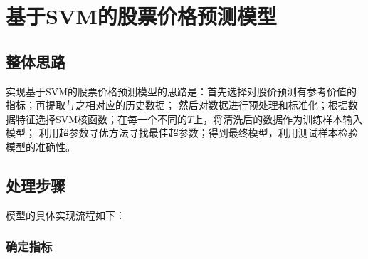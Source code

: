 \chapter{基于SVM的股票价格预测模型}

\section{整体思路}

实现基于SVM的股票价格预测模型的思路是：首先选择对股价预测有参考价值的指标；再提取与之相对应的历史数据；
然后对数据进行预处理和标准化；根据数据特征选择SVM核函数；在每一个不同的$T$上，将清洗后的数据作为训练样本输入模型；
利用超参数寻优方法寻找最佳超参数；得到最终模型，利用测试样本检验模型的准确性。

\section{处理步骤}

模型的具体实现流程如下：

\subsection{确定指标}

